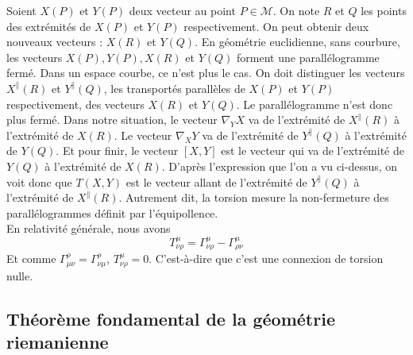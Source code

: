 \documentclass[a4paper,11pt]{report}
\theoremstyle{definition}
\theoremstyle{plain}
\theoremstyle{definition}
\theoremstyle{remark}
\newcommand{\M}{\mathscr{M}}
\begin{document}
                Soient $X(P)$ et $Y(P)$ deux vecteur au point $P\in \M$. On note $R$ et $Q$ les points des extrémités de $X(P)$ et $Y(P)$ respectivement. On peut obtenir deux nouveaux vecteurs : $X(R)$ et $Y(Q)$. En géométrie euclidienne, sans courbure, les vecteurs $X(P),Y(P),X(R)$ et $Y(Q)$ forment une parallélogramme fermé. Dans un espace courbe, ce n'est plus le cas. On doit distinguer les vecteurs $X^\parallel(R)$ et $Y^\parallel(Q)$, les transportés parallèles de $X(P)$ et $Y(P)$ respectivement, des vecteurs $X(R)$ et $Y(Q)$. Le parallélogramme n'est donc plus fermé. Dans notre situation, le vecteur $\nabla_Y X$ va de l'extrémité de $X^\parallel(R)$ à l'extrémité de $X(R)$. Le vecteur $\nabla_X Y$ va de l'extrémité de $Y^\parallel(Q)$ à l'extrémité de $Y(Q)$. Et pour finir, le vecteur $[X,Y]$ est le vecteur qui va de l'extrémité de $Y(Q)$ à l'extrémité de $X(R)$. D'après l'expression que l'on a vu ci-dessus, on voit donc que $T(X,Y)$ est le vecteur allant de l'extrémité de $Y^\parallel(Q)$ à l'extrémité de $X^\parallel(R)$. Autrement dit, la torsion mesure la non-fermeture des parallélogrammes définit par l'équipollence.\\
                
            
                En relativité générale, nous avons
                \begin{equation}
                    T^\mu_{\nu\rho} = \Gamma^\mu_{\nu\rho} - \Gamma^\mu_{\rho\nu}
                \end{equation}
                Et comme $\Gamma^\rho_{\mu\nu} = \Gamma^\rho_{\nu\mu}$, $T^\mu_{\nu\rho} = 0$. C'est-à-dire que c'est une connexion de torsion nulle.
                
            \subsection{Théorème fondamental de la géométrie riemanienne}
            
\end{document}
